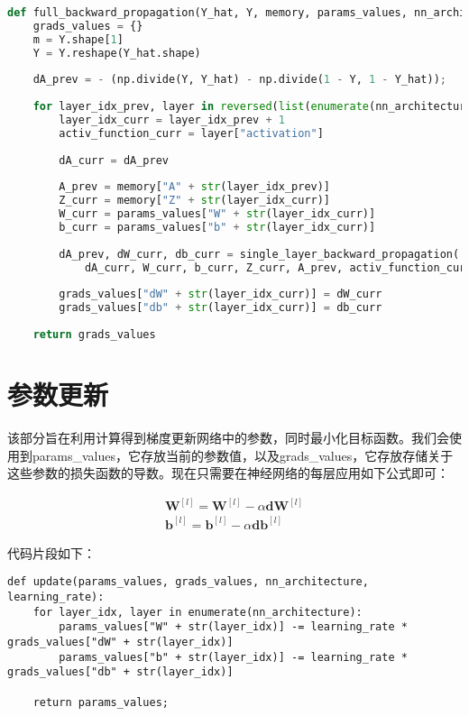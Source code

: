 \begin{lstlisting}[language=python, breaklines]
def full_backward_propagation(Y_hat, Y, memory, params_values, nn_architecture):
    grads_values = {}
    m = Y.shape[1]
    Y = Y.reshape(Y_hat.shape)
   
    dA_prev = - (np.divide(Y, Y_hat) - np.divide(1 - Y, 1 - Y_hat));
    
    for layer_idx_prev, layer in reversed(list(enumerate(nn_architecture))):
        layer_idx_curr = layer_idx_prev + 1
        activ_function_curr = layer["activation"]
        
        dA_curr = dA_prev
        
        A_prev = memory["A" + str(layer_idx_prev)]
        Z_curr = memory["Z" + str(layer_idx_curr)]
        W_curr = params_values["W" + str(layer_idx_curr)]
        b_curr = params_values["b" + str(layer_idx_curr)]
        
        dA_prev, dW_curr, db_curr = single_layer_backward_propagation(
            dA_curr, W_curr, b_curr, Z_curr, A_prev, activ_function_curr)
        
        grads_values["dW" + str(layer_idx_curr)] = dW_curr
        grads_values["db" + str(layer_idx_curr)] = db_curr
    
    return grads_values    
\end{lstlisting}

\section{参数更新}

该部分旨在利用计算得到梯度更新网络中的参数，同时最小化目标函数。我们会使用到params\_values，它存放当前的参数值，以及grads\_values，它存放存储关于这些参数的损失函数的导数。现在只需要在神经网络的每层应用如下公式即可：

\begin{align*}
\mathbf{W}^{[l]} = \mathbf{W}^{[l]} - \alpha\mathbf{dW}^{[l]} \\
\mathbf{b}^{[l]} = \mathbf{b}^{[l]} - \alpha\mathbf{db}^{[l]}
\end{align*}

代码片段如下：

\begin{lstlisting}
def update(params_values, grads_values, nn_architecture, learning_rate):
    for layer_idx, layer in enumerate(nn_architecture):
        params_values["W" + str(layer_idx)] -= learning_rate * grads_values["dW" + str(layer_idx)]        
        params_values["b" + str(layer_idx)] -= learning_rate * grads_values["db" + str(layer_idx)]

    return params_values;
\end{lstlisting}

